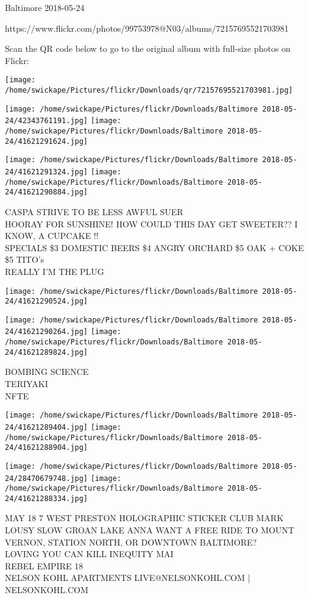 \documentclass[10pt,letterpaper]{article}
\begin{document}
Baltimore 2018-05-24

https://www.flickr.com/photos/99753978@N03/albums/72157695521703981

Scan the QR code below to go to the original album with full-size photos on Flickr:

\texttt{[image: /home/swickape/Pictures/flickr/Downloads/qr/72157695521703981.jpg]}
\pagebreak

\texttt{[image: /home/swickape/Pictures/flickr/Downloads/Baltimore 2018-05-24/42343761191.jpg]}
\texttt{[image: /home/swickape/Pictures/flickr/Downloads/Baltimore 2018-05-24/41621291624.jpg]}

\texttt{[image: /home/swickape/Pictures/flickr/Downloads/Baltimore 2018-05-24/41621291324.jpg]}
\texttt{[image: /home/swickape/Pictures/flickr/Downloads/Baltimore 2018-05-24/41621290884.jpg]}

CASPA STRIVE TO BE LESS AWFUL SUER\\
HOORAY FOR SUNSHINE!  HOW COULD THIS DAY GET SWEETER??  I KNOW, A CUPCAKE !!\\
SPECIALS \$3 DOMESTIC BEERS \$4 ANGRY ORCHARD \$5 OAK + COKE \$5 TITO's\\
REALLY I'M THE PLUG
\pagebreak

\texttt{[image: /home/swickape/Pictures/flickr/Downloads/Baltimore 2018-05-24/41621290524.jpg]}

\vspace{0.25in}
\texttt{[image: /home/swickape/Pictures/flickr/Downloads/Baltimore 2018-05-24/41621290264.jpg]}
\texttt{[image: /home/swickape/Pictures/flickr/Downloads/Baltimore 2018-05-24/41621289824.jpg]}

BOMBING SCIENCE\\
TERIYAKI\\
NFTE
\pagebreak

\texttt{[image: /home/swickape/Pictures/flickr/Downloads/Baltimore 2018-05-24/41621289404.jpg]}
\texttt{[image: /home/swickape/Pictures/flickr/Downloads/Baltimore 2018-05-24/41621288904.jpg]}

\texttt{[image: /home/swickape/Pictures/flickr/Downloads/Baltimore 2018-05-24/28470679748.jpg]}
\texttt{[image: /home/swickape/Pictures/flickr/Downloads/Baltimore 2018-05-24/41621288334.jpg]}

MAY 18 7 WEST PRESTON HOLOGRAPHIC STICKER CLUB MARK LOUSY SLOW GROAN LAKE ANNA WANT A FREE RIDE TO MOUNT VERNON, STATION NORTH, OR DOWNTOWN BALTIMORE?\\
LOVING YOU CAN KILL INEQUITY MAI\\
REBEL EMPIRE 18\\
NELSON KOHL APARTMENTS LIVE@NELSONKOHL.COM | NELSONKOHL.COM
\pagebreak
\end{document}
